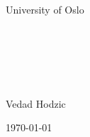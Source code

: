 
\begin{center}
    \LARGE University of Oslo\\[1.5cm]
	\Large \course \\ 
	\Large \handIn \\ [0.5cm]
    \HRule \\[0.4cm]

    { \huge \bfseries \projectTitle \\[0.4cm] }

    \HRule \\[1.5cm]


	\large Vedad Hodzic

    \vfill

    {\large \today}
\end{center}
